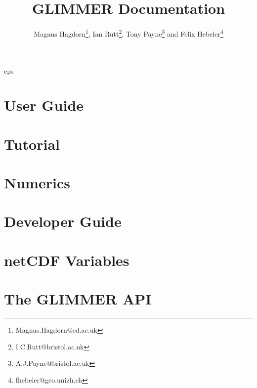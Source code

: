 
\frontmatter
\title{GLIMMER {\glimmerver} Documentation}
\author{Magnus Hagdorn\thanks{Magnus.Hagdorn@ed.ac.uk}, Ian
  Rutt\thanks{I.C.Rutt@bristol.ac.uk}, Tony Payne\thanks{A.J.Payne@bristol.ac.uk} 
  and Felix Hebeler\thanks{fhebeler@geo.unizh.ch}}
\maketitle
\tableofcontents

{
         {eps} 
         {%
         } 

}
{}

\mainmatter
\chapter{User Guide}
\newcommand{\dir}{ug}


\chapter{Tutorial}
\renewcommand{\dir}{tut}


\chapter{Numerics}
\renewcommand{\dir}{num}


\renewcommand{\dir}{ext}


\chapter{Developer Guide}
\renewcommand{\dir}{dg}



\appendix
\renewcommand{\dir}{ug}
\chapter{netCDF Variables}

\chapter{The GLIMMER API}





